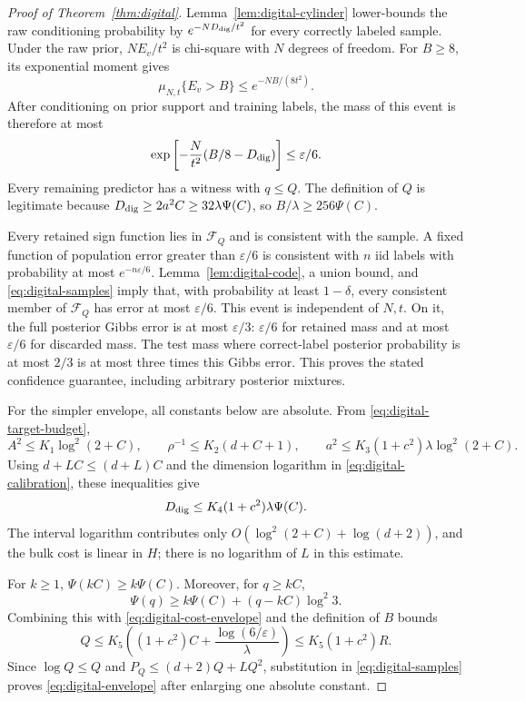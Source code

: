 \begin{proof}[Proof of Theorem~\ref{thm:digital}]
Lemma~\ref{lem:digital-cylinder} lower-bounds the raw conditioning
probability by $e^{-ND_{\rm dig}/t^2}$ for every correctly labeled sample.  Under
the raw prior, $NE_v/t^2$ is chi-square with $N$ degrees of freedom.
For $B\ge8$, its exponential moment gives
\[
 \mu_{N,t}\{E_v>B\}\le e^{-NB/(8t^2)}.
\]
After conditioning on prior support and training labels, the mass of
this event is therefore at most
\[
 \exp\left[-\frac N{t^2}(B/8-D_{\rm dig})\right]\le\varepsilon/6.
\]
Every remaining predictor has a witness with $q\le Q$.  The definition
of $Q$ is legitimate because
$D_{\rm dig}\ge2a^2C\ge32\lambda\Psi(C)$, so $B/\lambda\ge256\Psi(C)$.

Every retained sign function lies in $\mathcal F_Q$ and is consistent
with the sample.  A fixed function of population error greater than
$\varepsilon/6$ is consistent with $n$ iid labels with probability at
most $e^{-n\varepsilon/6}$.  Lemma~\ref{lem:digital-code}, a union bound,
and \eqref{eq:digital-samples} imply that, with probability at least
$1-\delta$, every consistent member of $\mathcal F_Q$ has error at most
$\varepsilon/6$.  This event is independent of $N,t$.
On it, the full posterior Gibbs error is at most $\varepsilon/3$:
$\varepsilon/6$ for retained mass and at most $\varepsilon/6$ for
discarded mass.  The test mass where correct-label posterior probability
is at most $2/3$ is at most three times this Gibbs error.  This proves the
stated confidence guarantee, including arbitrary posterior mixtures.

For the simpler envelope, all constants below are absolute.  From
\eqref{eq:digital-target-budget},
\[
 A^2\le K_1\log^2(2+C),\qquad
 \rho^{-1}\le K_2(d+C+1),\qquad
 a^2\le K_3(1+c^2)\lambda\log^2(2+C).
\]
Using $d+LC\le(d+L)C$ and the dimension logarithm in
\eqref{eq:digital-calibration}, these inequalities give
\begin{equation}\label{eq:digital-cost-envelope}
 D_{\rm dig}\le K_4(1+c^2)\lambda\Psi(C).
\end{equation}
The interval logarithm contributes only
$O(\log^2(2+C)+\log(d+2))$, and the bulk cost is linear in $H$;
there is no logarithm of $L$ in this estimate.

For $k\ge1$, $\Psi(kC)\ge k\Psi(C)$.  Moreover, for $q\ge kC$,
\[
 \Psi(q)\ge k\Psi(C)+(q-kC)\log^2 3.
\]
Combining this with \eqref{eq:digital-cost-envelope} and the definition
of $B$ bounds
\[
 Q\le K_5\left((1+c^2)C+
                  \frac{\log(6/\varepsilon)}\lambda\right)
       \le K_5(1+c^2)R.
\]
Since $\log Q\le Q$ and
$P_Q\le(d+2)Q+LQ^2$, substitution in
\eqref{eq:digital-samples} proves \eqref{eq:digital-envelope} after
enlarging one absolute constant.
\end{proof}

